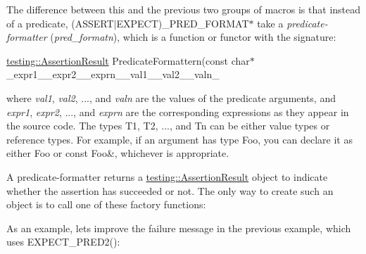 The difference between this and the previous two groups of macros is that instead of a predicate, {\ttfamily (A\+S\+S\+E\+R\+T$\vert$\+E\+X\+P\+E\+CT)\+\_\+\+P\+R\+E\+D\+\_\+\+F\+O\+R\+M\+A\+T$\ast$} take a {\itshape predicate-\/formatter} ({\itshape pred\+\_\+formatn}), which is a function or functor with the signature\+:

{\ttfamily \mbox{\hyperlink{classtesting_1_1_assertion_result}{testing\+::\+Assertion\+Result}} Predicate\+Formattern(const char$\ast$}\+\_\+expr1\+\_\+\_\+expr2\+\_\+\_\+exprn\+\_\+\_\+val1\+\_\+\_\+val2\+\_\+\_\+valn\+\_\+{\ttfamily );}

where {\itshape val1}, {\itshape val2}, ..., and {\itshape valn} are the values of the predicate arguments, and {\itshape expr1}, {\itshape expr2}, ..., and {\itshape exprn} are the corresponding expressions as they appear in the source code. The types {\ttfamily T1}, {\ttfamily T2}, ..., and {\ttfamily Tn} can be either value types or reference types. For example, if an argument has type {\ttfamily Foo}, you can declare it as either {\ttfamily Foo} or {\ttfamily const Foo\&}, whichever is appropriate.

A predicate-\/formatter returns a {\ttfamily \mbox{\hyperlink{classtesting_1_1_assertion_result}{testing\+::\+Assertion\+Result}}} object to indicate whether the assertion has succeeded or not. The only way to create such an object is to call one of these factory functions\+:

As an example, let\textquotesingle{}s improve the failure message in the previous example, which uses {\ttfamily E\+X\+P\+E\+C\+T\+\_\+\+P\+R\+E\+D2()}\+:


\begin{DoxyCode}{0}
\DoxyCodeLine{}
\DoxyCodeLine{}
\DoxyCodeLine{\}}
\end{DoxyCode}


